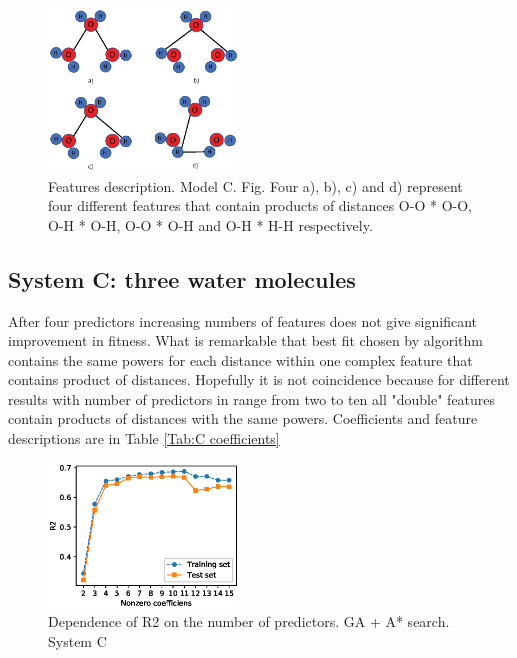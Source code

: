 \documentclass[aps,prl,reprint,amsmath,amssymb,nature]{revtex4-1}
\begin{document}
\begin{figure}
\includegraphics[width=0.45\textwidth]{media/water_distances_2.eps}
\caption{Features description. Model C. Fig. Four a), b), c) and d) represent four different features that contain products of distances O-O * O-O, O-H * O-H, O-O * O-H  and O-H * H-H respectively.}\label{Fig:C Dist1}
\end{figure}

\subsection{System C: three water molecules}

After four predictors increasing numbers of features does not give significant improvement in fitness. What is remarkable that best fit chosen by algorithm contains the same powers for each distance within one complex feature that contains product of distances. Hopefully it is not coincidence because for different results with number of predictors in range from two to ten all "double" features contain products of distances with the same powers. Coefficients and feature descriptions are in Table \ref{Tab:C coefficients}

\begin{figure}
\includegraphics[width=0.45\textwidth]{media/C_GA_PATH_R2.eps}
\caption{Dependence of R2 on the number of predictors. GA + A* search. System C}\label{Fig:C_R2}
\end{figure}
\end{document}
